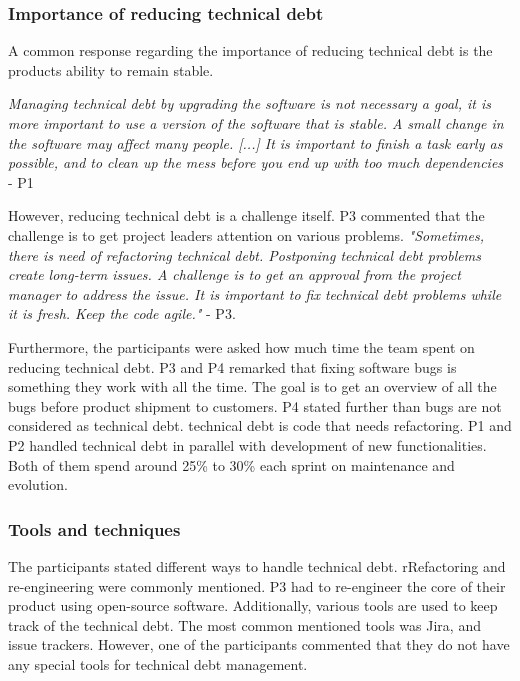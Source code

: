 \subsubsection{Importance of reducing technical debt}
A common response regarding the importance of reducing technical debt is the products ability to remain stable.

\begin{displayquote}
\textit{Managing technical debt by upgrading the software is not necessary a goal, it is more important to use a version of the software that is stable.  A small change in the software may affect many people. [...] It is important to finish a task early as possible, and to clean up the mess before you end up with too much dependencies} - P1
\end{displayquote}

However, reducing technical debt is a challenge itself. P3 commented that the challenge is to get project leaders attention on various problems. \textit{"Sometimes, there is need of refactoring technical debt. Postponing technical debt problems create long-term issues. A challenge is to get an approval from the project manager to address the issue. It is important to fix technical debt problems while it is fresh. Keep the code agile."} - P3. 

Furthermore, the participants were asked how much time the team spent on reducing technical debt. P3 and P4 remarked that fixing software bugs is something they work with all the time. The goal is to get an overview of all the bugs before product shipment to customers. P4 stated further than bugs are not considered as technical debt. technical debt is code that needs refactoring. P1 and P2 handled technical debt in parallel with development of new functionalities. Both of them spend around 25\% to 30\% each sprint on maintenance and evolution.


\subsubsection{Tools and techniques}
The participants stated different ways to handle technical debt. rRefactoring and re-engineering were commonly mentioned. P3 had to re-engineer the core of their product using open-source software. Additionally, various tools are used to keep track of the technical debt. The most common mentioned tools was Jira, and issue trackers. However, one of the participants commented that they do not have any special tools for technical debt management. 

